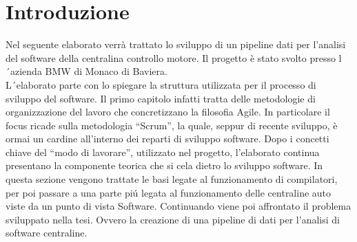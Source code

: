\documentclass[../main.tex]{subfiles}
\begin{document}
\section{Introduzione}
Nel seguente elaborato verrà trattato lo sviluppo di un pipeline dati per l'analisi del software della centralina controllo motore. Il progetto è stato svolto presso l´azienda \gls{BMW} di Monaco di Baviera.\\
L´elaborato parte con lo spiegare la struttura utilizzata per il processo di sviluppo del software. Il primo capitolo infatti tratta delle metodologie di organizzazione del lavoro che concretizzano la filosofia Agile. In particolare il focus ricade sulla metodologia “Scrum”, la quale, seppur di recente sviluppo, è ormai un cardine all'interno dei reparti di sviluppo software. 
Dopo i concetti chiave del “modo di lavorare”, utilizzato nel progetto, l'elaborato continua presentano la componente teorica che si cela dietro lo sviluppo software. In questa sezione vengono trattate le basi legate al funzionamento di compilatori, per poi passare a una parte piú legata al funzionamento delle centraline auto viste da un punto di vista Software.
Continuando viene poi affrontato il problema sviluppato nella tesi. Ovvero la creazione di una pipeline di dati per l'analisi di software centraline.\\
\end{document}
